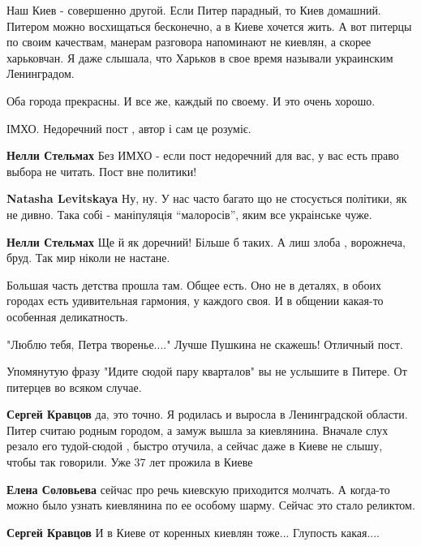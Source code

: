 \begin{itemize}
Наш Киев - совершенно другой. Если Питер парадный, то Киев домашний. Питером
можно восхищаться бесконечно, а в Киеве хочется жить. А вот питерцы по своим
качествам, манерам разговора напоминают не киевлян, а скорее харьковчан. Я даже
слышала, что Харьков в свое время называли украинским Ленинградом.

Оба города прекрасны. И все же, каждый по своему. И это очень хорошо.


ІМХО. Недоречний пост , автор і сам це розуміє.

\begin{itemize} %
\textbf{Нелли Стельмах}
Без ИМХО - если пост недоречний для вас, у вас есть право выбора не читать. Пост вне политики!

\textbf{Natasha Levitskaya} Ну, ну. У нас часто багато що не стосується політики, як не дивно. Така собі - маніпуляція “малоросів”, яким все украінське чуже.

\textbf{Нелли Стельмах} Ще й як доречний! Більше б таких. А лиш злоба , ворожнеча, бруд. Так мир ніколи не настане.
\end{itemize} %


Большая часть детства прошла там. Общее есть. Оно не в деталях, в обоих городах
есть удивительная гармония, у каждого своя. И в общении какая-то особенная
деликатность.

"Люблю тебя, Петра творенье...." Лучше Пушкина не скажешь! Отличный пост.

Упомянутую фразу "Идите сюдой пару кварталов" вы не услышите в Питере. От питерцев во всяком случае.

\begin{itemize} %
\textbf{Сергей Кравцов} да, это точно. Я родилась и выросла в Ленинградской области. Питер считаю родным городом, а замуж вышла за киевлянина. Вначале слух резало его тудой-сюдой , быстро отучила, а сейчас даже в Киеве не слышу, чтобы так говорили. Уже 37 лет прожила в Киеве

\textbf{Елена Соловьева} сейчас про речь киевскую приходится молчать. А когда-то можно было узнать киевлянина по ее особому шарму. Сейчас это стало реликтом.

\textbf{Сергей Кравцов} И в Киеве от коренных киевлян тоже... Глупость какая....
\end{itemize} %


\end{itemize}
